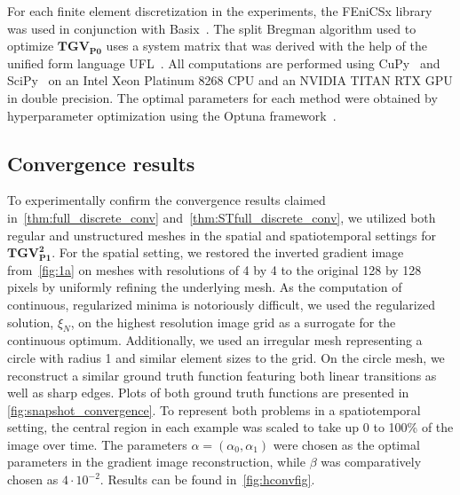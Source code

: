 \documentclass{article}
\begin{document}
	For each finite element discretization in the experiments, the FEniCSx library~\cite{Bar23} was used in conjunction with Basix~\cite{Sc22, Scr22}.
	The split Bregman algorithm used to optimize $\mathbf{TGV_{P0}}$ uses a system matrix that was derived with the help of the unified form language UFL~\cite{Al14}.
	All computations are performed using CuPy~\cite{CUPY} and SciPy~\cite{SCIPY} on an Intel Xeon Platinum 8268 CPU and an NVIDIA TITAN RTX GPU in double precision.
	The optimal parameters for each method were obtained by hyperparameter optimization using the Optuna framework~\cite{Ak19}.
	
	\subsection{Convergence results}
	To experimentally confirm the convergence results claimed in~\cref{thm:full_discrete_conv} and~\cref{thm:STfull_discrete_conv}, we utilized both regular and unstructured meshes in the spatial and spatiotemporal settings for $\mathbf{TGV^2_{P1}}$.
	For the spatial setting, we restored the inverted gradient image from~\cref{fig:1a} on meshes with resolutions of 4 by 4 to the original 128 by 128 pixels by uniformly refining the underlying mesh.
	As the computation of continuous, regularized minima is notoriously difficult, we used the regularized solution, $\xi_N$, on the highest resolution image grid as a surrogate for the continuous optimum.
	Additionally, we used an irregular mesh representing a circle with radius 1 and similar element sizes to the grid.
	On the circle mesh, we reconstruct a similar ground truth function featuring both linear transitions as well as sharp edges. 
	Plots of both ground truth functions are presented in \cref{fig:snapshot_convergence}.
	To represent both problems in a spatiotemporal setting, the central region in each example was scaled to take up 0 to 100\% of the image over time.
	The parameters $\alpha = (\alpha_0, \alpha_1)$ were chosen as the optimal parameters in the gradient image reconstruction, while $\beta$ was comparatively chosen as $4\cdot10^{-2}$.
	Results can be found in~\cref{fig:hconvfig}.
	
\end{document}
